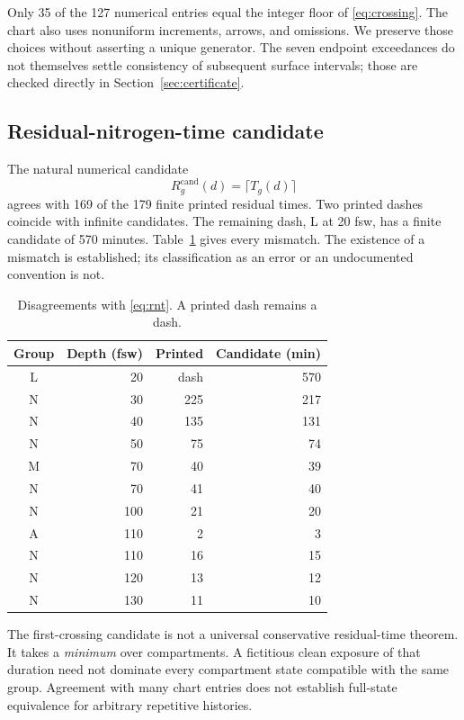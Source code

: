 \documentclass[11pt,letterpaper]{article}
\begin{document}
Only 35 of the 127 numerical entries equal the integer floor of \eqref{eq:crossing}. The chart also uses nonuniform increments, arrows, and omissions. We preserve those choices without asserting a unique generator. The seven endpoint exceedances do not themselves settle consistency of subsequent surface intervals; those are checked directly in Section~\ref{sec:certificate}.

\subsection{Residual-nitrogen-time candidate}
The natural numerical candidate
\begin{equation}
R^{\mathrm{cand}}_g(d)=\lceil T_g(d)\rceil
\label{eq:rnt}
\end{equation}
agrees with 169 of the 179 finite printed residual times. Two printed dashes coincide with infinite candidates. The remaining dash, L at 20 fsw, has a finite candidate of 570 minutes. Table~\ref{tab:rnt} gives every mismatch. The existence of a mismatch is established; its classification as an error or an undocumented convention is not.

\begin{table}[ht]\centering
\caption{Disagreements with \eqref{eq:rnt}. A printed dash remains a dash.}\label{tab:rnt}
\begin{tabular}{@{}crrr@{}}\toprule
Group&Depth (fsw)&Printed&Candidate (min)\\\midrule
L&20&dash&570\\N&30&225&217\\N&40&135&131\\N&50&75&74\\
M&70&40&39\\N&70&41&40\\N&100&21&20\\A&110&2&3\\
N&110&16&15\\N&120&13&12\\N&130&11&10\\\bottomrule
\end{tabular}
\end{table}

The first-crossing candidate is not a universal conservative residual-time theorem. It takes a \emph{minimum} over compartments. A fictitious clean exposure of that duration need not dominate every compartment state compatible with the same group. Agreement with many chart entries does not establish full-state equivalence for arbitrary repetitive histories.
\end{document}

